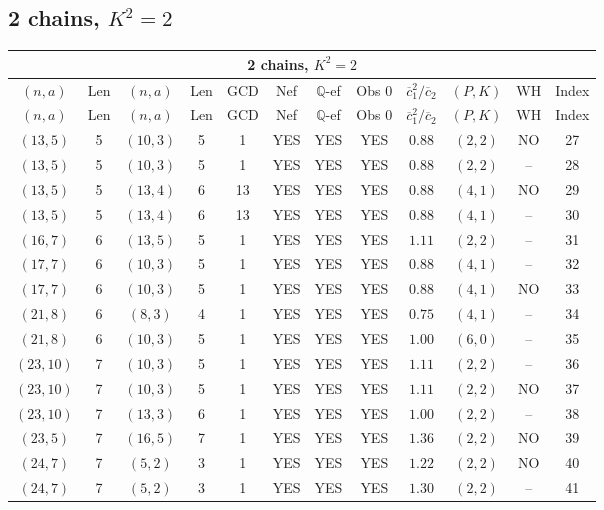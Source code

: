 \subsection{2 chains, $K^2 = 2$}
\begin{longtable}{|c|c|c|c|c|c|c|c|c|c|c|c|}
\hline
\multicolumn{12}{|c|}{2 chains, $K^2 = 2$}\\
\hline
$(n,a)$ & Len & $(n,a)$ & Len & GCD & Nef & $\mathbb Q$-ef & Obs 0 & $\overline c_1^2 / \overline c_2$ & $(P,K)$ & WH & Index\\
\hline
\endfirsthead

\hline
$(n,a)$ & Len & $(n,a)$ & Len & GCD & Nef & $\mathbb Q$-ef & Obs 0 & $\overline c_1^2 / \overline c_2$ & $(P,K)$ & WH & Index\\
\hline
\endhead
\hline
\endfoot

$(13,5)$ & 5 & $(10,3)$ & 5 & 1 & YES & YES & YES & $0.88$ & $(2,2)$ & NO & 27\\
$(13,5)$ & 5 & $(10,3)$ & 5 & 1 & YES & YES & YES & $0.88$ & $(2,2)$ & -- & 28\\
$(13,5)$ & 5 & $(13,4)$ & 6 & 13 & YES & YES & YES & $0.88$ & $(4,1)$ & NO & 29\\
$(13,5)$ & 5 & $(13,4)$ & 6 & 13 & YES & YES & YES & $0.88$ & $(4,1)$ & -- & 30\\
$(16,7)$ & 6 & $(13,5)$ & 5 & 1 & YES & YES & YES & $1.11$ & $(2,2)$ & -- & 31\\
$(17,7)$ & 6 & $(10,3)$ & 5 & 1 & YES & YES & YES & $0.88$ & $(4,1)$ & -- & 32\\
$(17,7)$ & 6 & $(10,3)$ & 5 & 1 & YES & YES & YES & $0.88$ & $(4,1)$ & NO & 33\\
$(21,8)$ & 6 & $(8,3)$ & 4 & 1 & YES & YES & YES & $0.75$ & $(4,1)$ & -- & 34\\
$(21,8)$ & 6 & $(10,3)$ & 5 & 1 & YES & YES & YES & $1.00$ & $(6,0)$ & -- & 35\\
$(23,10)$ & 7 & $(10,3)$ & 5 & 1 & YES & YES & YES & $1.11$ & $(2,2)$ & -- & 36\\
$(23,10)$ & 7 & $(10,3)$ & 5 & 1 & YES & YES & YES & $1.11$ & $(2,2)$ & NO & 37\\
$(23,10)$ & 7 & $(13,3)$ & 6 & 1 & YES & YES & YES & $1.00$ & $(2,2)$ & -- & 38\\
$(23,5)$ & 7 & $(16,5)$ & 7 & 1 & YES & YES & YES & $1.36$ & $(2,2)$ & NO & 39\\
$(24,7)$ & 7 & $(5,2)$ & 3 & 1 & YES & YES & YES & $1.22$ & $(2,2)$ & NO & 40\\
$(24,7)$ & 7 & $(5,2)$ & 3 & 1 & YES & YES & YES & $1.30$ & $(2,2)$ & -- & 41\\

\end{longtable}
